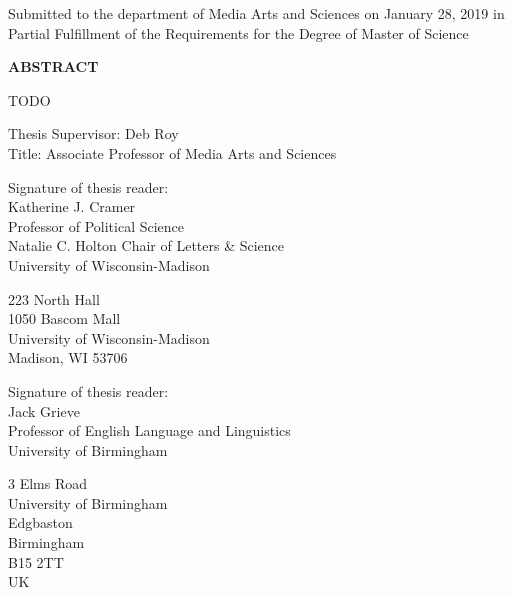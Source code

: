 \documentclass{scrartcl}
\makeatletter
\renewcommand\tableofcontents{%
  \null\hfill\textbf{\Large\contentsname}\hfill\null\par
  \@mkboth{\MakeUppercase\contentsname}{\MakeUppercase\contentsname}%
  \@starttoc{toc}%
}
\makeatother
\begin{document}
\maketitle

\begin{center}
Submitted to the department of Media Arts and Sciences on January 28, 2019 in Partial Fulfillment of the Requirements for the Degree of Master of Science
\end{center}

\textbf{ABSTRACT}

TODO

Thesis Supervisor: Deb Roy\\
Title: Associate Professor of Media Arts and Sciences

\newpage
\maketitle

Signature of thesis reader: \makebox[\linegoal]{\hrulefill}\\

Katherine J. Cramer\\
Professor of Political Science\\
Natalie C. Holton Chair of Letters \& Science\\
University of Wisconsin-Madison

223 North Hall\\
1050 Bascom Mall\\
University of Wisconsin-Madison\\
Madison, WI 53706

\newpage
\maketitle

Signature of thesis reader: \makebox[\linegoal]{\hrulefill}\\

Jack Grieve\\
Professor of English Language and Linguistics\\
University of Birmingham

3 Elms Road\\
University of Birmingham\\
Edgbaston\\
Birmingham\\
B15 2TT\\
UK

\newpage
\tableofcontents
\newpage
\end{document}

